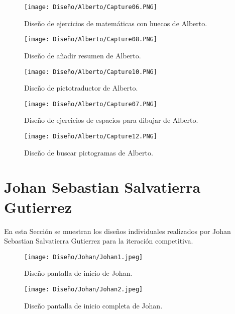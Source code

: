 \begin{figure}[ht!]
  \centering
  \texttt{[image: Diseño/Alberto/Capture06.PNG]}
  \caption{Diseño de ejercicios de matemáticas con huecos de Alberto.}
  \label{Alberto6}
\end{figure}

\begin{figure}[ht!]
  \centering
  \texttt{[image: Diseño/Alberto/Capture08.PNG]}
  \caption{Diseño de añadir resumen de Alberto.}
  \label{Alberto8}
\end{figure}

\begin{figure}[ht!]
  \centering
  \texttt{[image: Diseño/Alberto/Capture10.PNG]}
  \caption{Diseño de pictotraductor de Alberto.}
  \label{Alberto10}
\end{figure}

\begin{figure}[ht!]
  \centering
  \texttt{[image: Diseño/Alberto/Capture07.PNG]}
  \caption{Diseño de ejercicios de espacios para dibujar de Alberto.}
  \label{Alberto7}
\end{figure}

\begin{figure}[ht!]
  \centering
  \texttt{[image: Diseño/Alberto/Capture12.PNG]}
  \caption{Diseño de buscar pictogramas de Alberto.}
  \label{Alberto12}
\end{figure}







\section{Johan Sebastian Salvatierra Gutierrez}
En esta Sección se muestran los diseños individuales realizados por Johan Sebastian Salvatierra Gutierrez para la iteración competitiva.

\begin{figure}[ht!]
  \centering
  \texttt{[image: Diseño/Johan/Johan1.jpeg]}
  \caption{Diseño pantalla de inicio de Johan.} 
  \label{Johan1}
\end{figure}

\begin{figure}[ht!]
  \centering
  \texttt{[image: Diseño/Johan/Johan2.jpeg]}
  \caption{Diseño pantalla de inicio completa de Johan.}
  \label{Johan2}
\end{figure}

